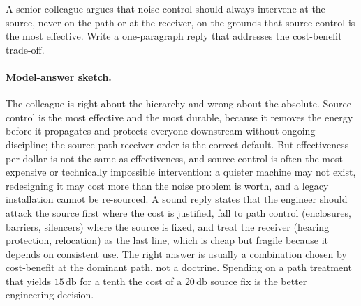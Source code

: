 \begin{exercise}
A senior colleague argues that noise control should always intervene
at the source, never on the path or at the receiver, on the grounds
that source control is the most effective. Write a one-paragraph
reply that addresses the cost-benefit trade-off.
\paragraph{Model-answer sketch.} The colleague is right about the
hierarchy and wrong about the absolute. Source control is the most
effective and the most durable, because it removes the energy before
it propagates and protects everyone downstream without ongoing
discipline; the source-path-receiver order is the correct default. But
effectiveness per dollar is not the same as effectiveness, and source
control is often the most expensive or technically impossible
intervention: a quieter machine may not exist, redesigning it may cost
more than the noise problem is worth, and a legacy installation cannot
be re-sourced. A sound reply states that the engineer should attack
the source first where the cost is justified, fall to path control
(enclosures, barriers, silencers) where the source is fixed, and treat
the receiver (hearing protection, relocation) as the last line, which
is cheap but fragile because it depends on consistent use. The right
answer is usually a combination chosen by cost-benefit at the dominant
path, not a doctrine. Spending on a path treatment that yields
$15\,\si{\decibel}$ for a tenth the cost of a $20\,\si{\decibel}$
source fix is the better engineering decision.
\end{exercise}

